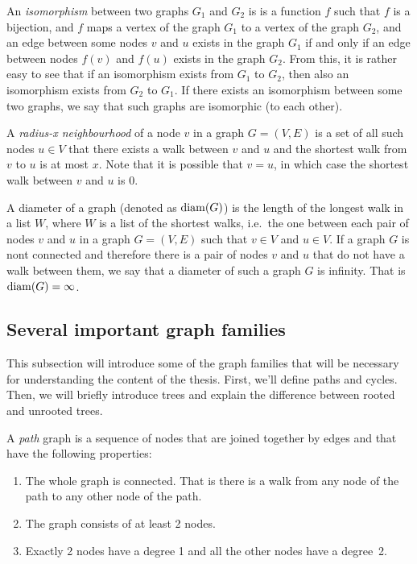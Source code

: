 An \emph{isomorphism} between two graphs $G_1$ and $G_2$ is is a function $f$ such that $f$ is a 
bijection, and $f$ maps a vertex of the graph $G_1$ to a vertex of the graph $G_2$, and 
an edge between some nodes $v$ and $u$ exists in the graph $G_1$ if and only if
an edge between nodes $f(v)$ and $f(u)$ exists in the graph $G_2$. From this,
it is rather easy to see that if an isomorphism exists from $G_1$ to $G_2$, then
also an isomorphism exists from $G_2$ to $G_1$. If there exists an
isomorphism between some two graphs, we say that such graphs are isomorphic
(to each other).

A \emph{radius-x neighbourhood} of a node $v$ in a graph $G = (V, E)$ is a set of
all such nodes $u \in V$ that there exists a walk between $v$ and $u$ and 
the shortest walk from $v$ to $u$ is at most $x$. Note that it is possible that
$v = u$, in which case the shortest walk between $v$ and $u$ is 0.

A diameter of a graph (denoted as $\operatorname{diam}(G)$) is the length of the longest walk
in a list $W$, where $W$ is a list of the shortest walks, i.e.\ the one between each pair of nodes
$v$ and $u$ in a graph $G = (V, E)$ such that $v \in V$ and $u \in V$. If a graph
$G$ is nont connected and therefore there is a pair of nodes $v$ and $u$ that do not
have a walk between them, we say that a diameter of such a graph $G$ is infinity. That
is $\operatorname{diam}(G) = \infty$.

\subsection{Several important graph families}

This subsection will introduce some of the graph families that will be necessary
for understanding the content of the thesis. First, we'll define paths and cycles.
Then, we will briefly introduce trees and explain the difference between rooted
and unrooted trees.

A \emph{path} graph is a sequence of nodes that are joined together by edges and
that have the following properties:

\begin{enumerate}
  \item The whole graph is connected. That is there is a walk from any node of
  the path to any other node of the path.

  \item The graph consists of at least 2 nodes.

  \item Exactly 2 nodes have a degree 1 and all the other nodes have a degree~2.
\end{enumerate}

